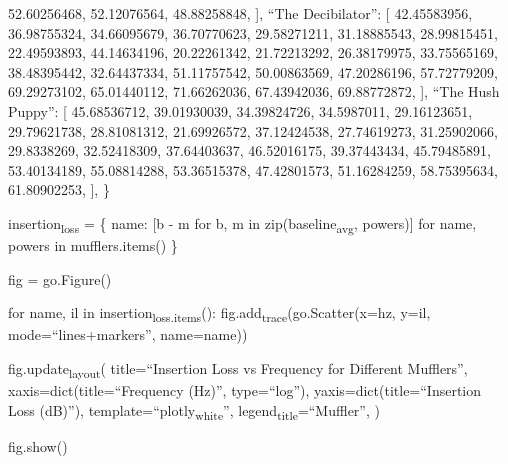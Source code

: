 \documentclass[presentation]{beamer}
\begin{document}
        52.60256468,
        52.12076564,
        48.88258848,
    ],
    ``The Decibilator'': [
        42.45583956,
        36.98755324,
        34.66095679,
        36.70770623,
        29.58271211,
        31.18885543,
        28.99815451,
        22.49593893,
        44.14634196,
        20.22261342,
        21.72213292,
        26.38179975,
        33.75565169,
        38.48395442,
        32.64437334,
        51.11757542,
        50.00863569,
        47.20286196,
        57.72779209,
        69.29273102,
        65.01440112,
        71.66262036,
        67.43942036,
        69.88772872,
    ],
    ``The Hush Puppy'': [
        45.68536712,
        39.01930039,
        34.39824726,
        34.5987011,
        29.16123651,
        29.79621738,
        28.81081312,
        21.69926572,
        37.12424538,
        27.74619273,
        31.25902066,
        29.8338269,
        32.52418309,
        37.64403637,
        46.52016175,
        39.37443434,
        45.79485891,
        53.40134189,
        55.08814288,
        53.36515378,
        47.42801573,
        51.16284259,
        58.75395634,
        61.80902253,
    ],
\}

insertion\textsubscript{loss} = \{
    name: [b - m for b, m in zip(baseline\textsubscript{avg}, powers)]
    for name, powers in mufflers.items()
\}

fig = go.Figure()

for name, il in insertion\textsubscript{loss.items}():
    fig.add\textsubscript{trace}(go.Scatter(x=hz, y=il, mode=``lines+markers'', name=name))

fig.update\textsubscript{layout}(
    title=``Insertion Loss vs Frequency for Different Mufflers'',
    xaxis=dict(title=``Frequency (Hz)'', type=``log''),
    yaxis=dict(title=``Insertion Loss (dB)''),
    template=``plotly\textsubscript{white}'',
    legend\textsubscript{title}=``Muffler'',
)

fig.show()
\end{document}
